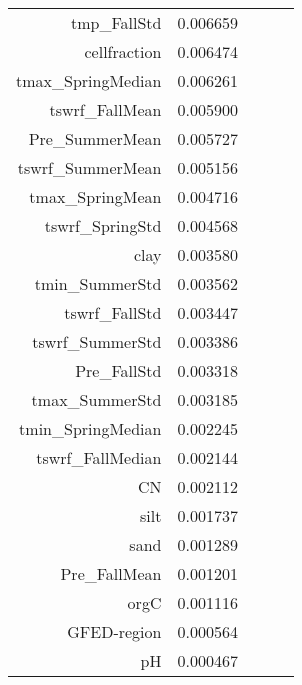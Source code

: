 \begin{table}[h]
\begin{tabular}{rrrrr}
tmp_FallStd & 0.006659 \\
cellfraction & 0.006474 \\
tmax_SpringMedian & 0.006261 \\
tswrf_FallMean & 0.005900 \\
Pre_SummerMean & 0.005727 \\
tswrf_SummerMean & 0.005156 \\
tmax_SpringMean & 0.004716 \\
tswrf_SpringStd & 0.004568 \\
clay & 0.003580 \\
tmin_SummerStd & 0.003562 \\
tswrf_FallStd & 0.003447 \\
tswrf_SummerStd & 0.003386 \\
Pre_FallStd & 0.003318 \\
tmax_SummerStd & 0.003185 \\
tmin_SpringMedian & 0.002245 \\
tswrf_FallMedian & 0.002144 \\
CN & 0.002112 \\
silt & 0.001737 \\
sand & 0.001289 \\
Pre_FallMean & 0.001201 \\
orgC & 0.001116 \\
GFED-region & 0.000564 \\
pH & 0.000467 \\
\bottomrule
\end{tabular}
\end{table}
